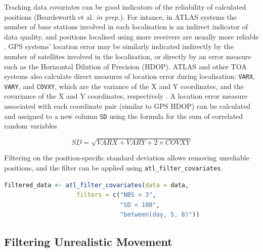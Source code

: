\documentclass[10pt,paper=a4,headings=standardclasses
]{scrartcl}
\begin{document}
Tracking data covariates can be good indicators of the reliability of calculated positions (Beardsworth et al. \textit{in prep.}).
For intance, in ATLAS systems the number of base stations involved in each localisation is an indirect indicator of data quality, and positions localised using more receivers are usually more reliable \citep[the minimum required for an ATLAS localisation is 3; see][]{weiser2016}.
GPS systems' location error may be similarly indicated indirectly by the number of satellites involved in the localisation, or directly by an error measure such as the Horizontal Dilution of Precision (HDOP).
ATLAS and other TOA systems also calculate direct measures of location error during localisation: \texttt{VARX}, \texttt{VARY}, and \texttt{COVXY}, which are the variance of the X and Y coordinates, and the covariance of the X and Y coordinates, respectively \citep{maccurdy2009, maccurdy2019, weiser2016}.
A location error measure associated with each coordinate pair (similar to GPS HDOP) can be calculated and assigned to a new column \texttt{SD} using the formula for the sum of correlated random variables
\begin{linenomath*}
    \begin{equation*}
        SD = \sqrt{{VARX} + {VARY} + 2 \times {COVXY}}
     \end{equation*}
\end{linenomath*}
Filtering on the position-specific standard deviation allows removing unreliable positions, and the filter can be applied using \texttt{atl\_filter\_covariates}.

\begin{lstlisting}[float, language=R, style=customR, caption = {
    Filtering ATLAS data on position covariates. 
    The \texttt{filters} argument accepts a character vector with the logical statements. 
    The function only retains data for which \textit{all} the conditions are satisfied; here that is positions calculated using $>$ 3 base stations (\texttt{NBS}), with location error (\texttt{SD}) $<$ 100, and data between an arbitrary day 5 and day 8.}]
filtered_data <- atl_filter_covariates(data = data,
                    filters = c("NBS > 3",
                                "SD < 100",
                                "between(day, 5, 8)"))
\end{lstlisting}

\subsection{Filtering Unrealistic Movement}
\end{document}
